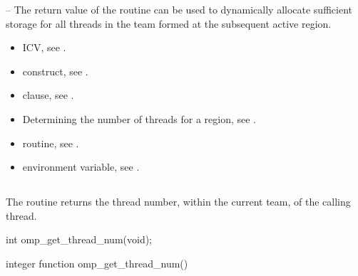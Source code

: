 \notestart
\noteheader -- The return value of the  routine can be used to 
dynamically allocate sufficient storage for all threads in the team formed at the 
subsequent active  region.
\noteend

\crossreferences
\begin{itemize}
\item {} ICV, see 
.

\item {} construct, see 
.

\item {} clause, see 
.

\item Determining the number of threads for a  region, see
. 

\item {} routine, see 
.

\item {} environment variable, see 
.
\end{itemize}









\newpage %

\subsection{}
\label{subsec:omp_get_thread_num}
\summary
The  routine returns the thread number, within the current 
team, of the calling thread.

\format
\ccppspecificstart
\begin{boxedcode}
int omp\_get\_thread\_num(void); 
\end{boxedcode}
\ccppspecificend

\fortranspecificstart
\begin{boxedcode}
integer function omp\_get\_thread\_num() 
\end{boxedcode}
\fortranspecificend

